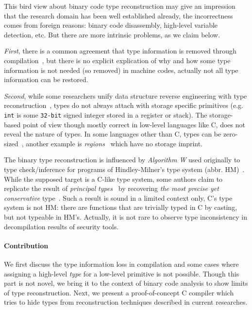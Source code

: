 \documentclass[a4paper]{llncs}
\begin{document}
This bird view about binary code type reconstruction may give an impression that the
research domain has been well established already, the incorrectness comes from foreign
reasons: binary code disassembly, high-level variable detection, etc.
But there are more intrinsic problems, as we claim below.

\emph{First}, there is a common agreement that type information is removed through compilation~\cite{lee_tie_2011,caballero_type_2016,lin_automatic_2010},
but there is no explicit explication of why and how some type information is not needed
(so removed) in machine codes, actually not all type information can be restored.

\emph{Second}, while some researchers unify data structure reverse engineering with
type reconstruction~\cite{caballero_type_2016, caballero_polyglot_2007}, types do not
always attach with storage specific primitives (e.g. \texttt{int} is some \texttt{32-bit}
signed integer stored in a register or stack). The storage-based point of view though
mostly correct in low-level languages like C, does not reveal the nature of types. In
some languages other than C, types can be zero-sized~\cite{noauthor_phantom_nodate},
another example is \emph{regions}~\cite{grossman_region-based_2002} which have no
storage imprint.

The binary type reconstruction is influenced by \emph{Algorithm W} used originally to
type check/inference for programs of Hindley-Milner's type system (abbr. HM)~\cite{milner_theory_1978,hindley_principal_1969,cardelli_basic_1987}.
While the supposed target is a C-like type system, some authors claim to replicate
the result of \emph{principal types}~\cite{damas_principal_1982,hindley_principal_1969}
by recovering \emph{the most precise yet conservative} type~\cite{lee_tie_2011}.
Such a result is sound in a limited context only, C's type system is not HM: there
are functions that are trivially typed in C by casting, but not typeable in HM's.
Actually, it is not rare to observe type inconsistency in decompilation results
of security tools.

\paragraph{Contribution}
We first discuss the type information loss in compilation and some cases
where assigning a high-level \emph{type} for a low-level primitive
is not possible. Though this part is not novel, we bring it to the context
of binary code analysis to show limits of type reconstruction. Next, we present
a proof-of-concept C compiler which tries to hide types from reconstruction techniques described
in current researches.
\end{document}
